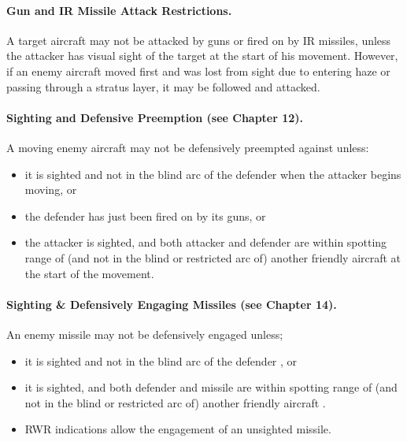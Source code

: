 \paragraph{Gun and IR Missile Attack Restrictions.} A target aircraft may not be attacked by guns or fired on by IR missiles, unless the attacker has visual sight of the target at the start of his movement. However, if an enemy aircraft moved first and was lost from sight due to entering haze or passing through a stratus layer, it may be followed and attacked.

\paragraph{Sighting and Defensive Preemption (see Chapter 12).} A moving enemy aircraft may not be defensively preempted against unless:

\begin{itemize}
    \item it is sighted and not in the blind arc of the defender when the attacker begins moving, or
    \item the defender has just been fired on by its guns, or
    \item the attacker is sighted, and both attacker and defender are within spotting range of (and not in the blind or restricted arc of) another friendly aircraft at the start of the  movement.
\end{itemize}


\paragraph{Sighting \& Defensively Engaging Missiles (see Chapter 14).} An enemy missile may not be defensively engaged unless;

\begin{itemize}
    \item it is sighted and not in the blind arc of the defender , or
    \item it is sighted, and both defender and missile are within spotting range of (and not in the blind or restricted arc of) another friendly aircraft .
    \item RWR indications allow the engagement of an unsighted missile.
\end{itemize}

